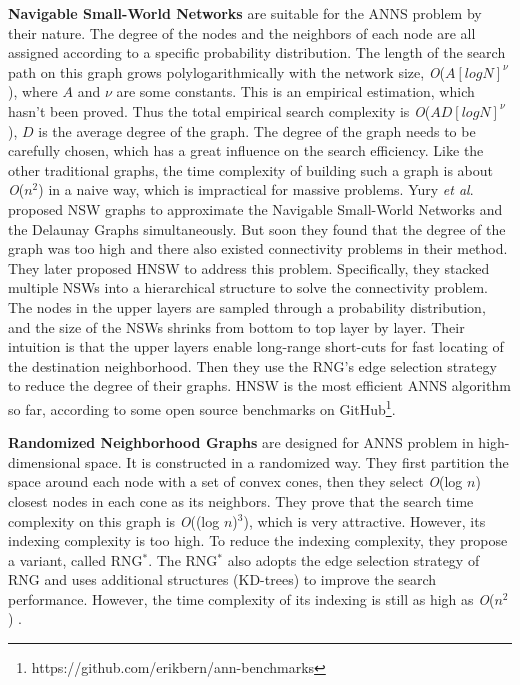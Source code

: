 \documentclass{vldb}
\def\etal{\emph{et al}.}
\begin{document}
\textbf{Navigable Small-World Networks} \cite{kleinberg2000navigation, boguna2009navigability} are suitable for the ANNS problem by their nature. The degree of the nodes and the neighbors of each node are all assigned according to a specific probability distribution. The length of the search path on this graph grows polylogarithmically with the network size, \textit{O}($A[logN]^\nu$), where $A$ and $\nu$ are some constants. This is an empirical estimation, which hasn't been proved. Thus the total empirical search complexity is \textit{O}($AD[logN]^\nu$), $D$ is the average degree of the graph. The degree of the graph needs to be carefully chosen, which has a great influence on the search efficiency. Like the other traditional graphs, the time complexity of building such a graph is about \textit{O}($n^2$) in a naive way, which is impractical for massive problems. Yury \etal \cite{malkov2014approximate} proposed NSW graphs to approximate the Navigable Small-World Networks and the Delaunay Graphs simultaneously. But soon they found that the degree of the graph was too high and there also existed connectivity problems in their method. They later proposed HNSW \cite{MalkovYHNSW16} to address this problem. Specifically, they stacked multiple NSWs into a hierarchical structure to solve the connectivity problem. The nodes in the upper layers are sampled through a probability distribution, and the size of the NSWs shrinks from bottom to top layer by layer. Their intuition is that the upper layers enable long-range short-cuts for fast locating of the destination neighborhood. Then they use the RNG's edge selection strategy to reduce the degree of their graphs. HNSW is the most efficient ANNS algorithm so far, according to some open source benchmarks on GitHub\footnote{https://github.com/erikbern/ann-benchmarks}. 

\textbf{Randomized Neighborhood Graphs} \cite{arya1993approximate} are designed for ANNS problem in high-dimensional space. It is constructed in a randomized way. They first partition the space around each node with a set of convex cones, then they select \textit{O}(log $n$) closest nodes in each cone as its neighbors. They prove that the search time complexity on this graph is \textit{O}((log $n$)$^3$), which is very attractive. However, its indexing complexity is too high. To reduce the indexing complexity, they propose a variant, called RNG$^*$. The RNG$^*$ also adopts the edge selection strategy of RNG and uses additional structures (KD-trees) to improve the search performance. However, the time complexity of its indexing is still as high as \textit{O}($n^2$) \cite{arya1993approximate}.
\end{document}
